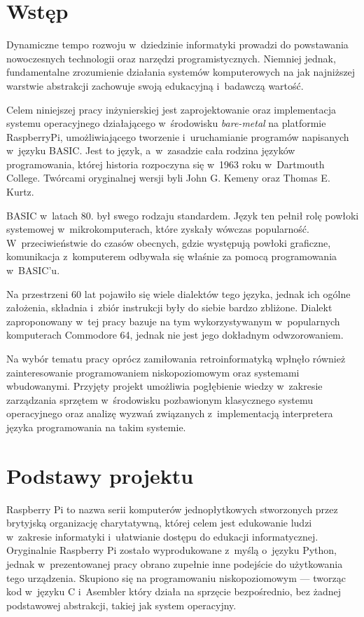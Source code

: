 \documentclass[shortabstract]{iithesis}
\author         {Aleksandra Kosińska \and Cezary Stajszczyk}
\date           {31 sierpnia 2023}                     %
\begin{document}

\chapter*{Wstęp}
Dynamiczne tempo rozwoju w~dziedzinie informatyki prowadzi do powstawania nowoczesnych technologii oraz narzędzi programistycznych. Niemniej jednak, fundamentalne zrozumienie działania systemów komputerowych na jak najniższej warstwie abstrakcji zachowuje swoją edukacyjną i~badawczą wartość.

Celem niniejszej pracy inżynierskiej jest zaprojektowanie oraz implementacja systemu operacyjnego działającego w~środowisku \textit{bare-metal} na platformie RaspberryPi, umożliwiającego tworzenie i~uruchamianie programów napisanych w~języku BASIC. Jest to język, a~w~zasadzie cała rodzina języków programowania, której historia rozpoczyna się w~1963 roku w~Dartmouth College. Twórcami oryginalnej wersji byli John G. Kemeny oraz Thomas E. Kurtz. 

BASIC w~latach 80. był swego rodzaju standardem. Język ten pełnił rolę powłoki systemowej w~mikrokomputerach, które zyskały wówczas popularność. W~przeciwieństwie do czasów obecnych, gdzie występują powłoki graficzne, komunikacja z~komputerem odbywała się właśnie za pomocą programowania w~BASIC'u.

Na przestrzeni 60 lat pojawiło się wiele dialektów tego języka, jednak ich ogólne założenia, składnia i~zbiór instrukcji były do siebie bardzo zbliżone. Dialekt zaproponowany w~tej pracy bazuje na tym wykorzystywanym w~popularnych komputerach Commodore 64, jednak nie jest jego dokładnym odwzorowaniem.

Na wybór tematu pracy oprócz zamiłowania retroinformatyką wpłnęło również zainteresowanie programowaniem niskopoziomowym oraz systemami wbudowanymi. Przyjęty projekt umożliwia pogłębienie wiedzy w~zakresie zarządzania sprzętem w~środowisku pozbawionym klasycznego systemu operacyjnego oraz analizę wyzwań związanych z~implementacją interpretera języka programowania na takim systemie.


\chapter{Podstawy projektu}
Raspberry Pi to nazwa serii komputerów jednopłytkowych stworzonych przez brytyjską organizację charytatywną, której celem jest edukowanie ludzi w~zakresie informatyki i~ułatwianie dostępu do edukacji informatycznej. Oryginalnie Raspberry Pi zostało wyprodukowane z~myślą o~języku Python, jednak w~prezentowanej pracy obrano zupełnie inne podejście do użytkowania tego urządzenia. Skupiono się na programowaniu niskopoziomowym --- tworząc kod w~języku C i~Asembler który działa na sprzęcie bezpośrednio, bez żadnej podstawowej abstrakcji, takiej jak system operacyjny.
\end{document}
